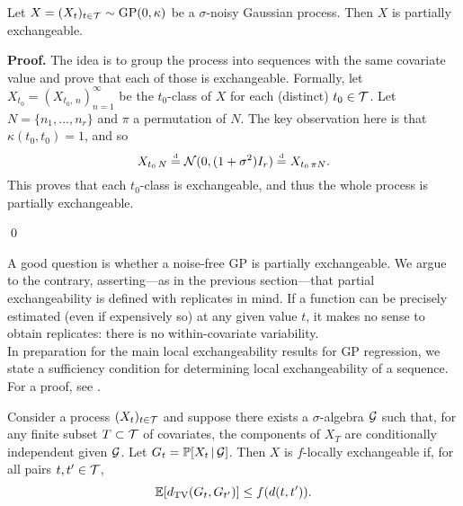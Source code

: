 \begin{proposition} \label{prop:GP_partial_exch}
	Let $X = (X_t)_{t \in \mathcal{T}} \sim \mathrm{GP} (0, \kappa)$ be a $\sigma$-noisy Gaussian process. Then $X$ is partially exchangeable.
\end{proposition}

\textbf{Proof. \hspace{0.05cm}} The idea is to group the process into sequences with the same covariate value and prove that each of those is exchangeable. Formally, let $X_{t_0} = (X_{t_0, \, n})_{n=1}^{\infty}$ be the $t_0$-class of $X$ for each (distinct) $t_0 \in \mathcal{T}$. Let $N = \{n_1, ..., n_r \}$ and $\pi$ a permutation of $N$. The key observation here is that $\kappa(t_0, t_0) = 1$, and so
\begin{equation} \label{eq:GP_partial_exchangeability}
	X_{t_0 \, N} \stackrel{\text{\rm\tiny d}}{=} \mathcal{N} (0, (1+\sigma^2) I_r) \stackrel{\text{\rm\tiny d}}{=} X_{t_0 \, \pi N}.
\end{equation}
This proves that each $t_0$-class is exchangeable, and thus the whole process is partially exchangeable.

\qed

\vskip 0.2cm

A good question is whether a noise-free GP is partially exchangeable. We argue to the contrary, asserting---as in the previous section---that partial exchangeability is defined with replicates in mind. If a function can be precisely estimated (even if expensively so) at any given value $t$, it makes no sense to obtain replicates: there is no within-covariate variability. 
\\




In preparation for the main local exchangeability results for GP regression, we state a sufficiency condition for determining local exchangeability of a sequence. For a proof, see \cite[][Proposition 3]{CampbellEtAl:2019:LocalExch}.

\begin{proposition} \label{prop:sufficient_local_exchangeability}
	Consider a process $(X_t)_{t \in \mathcal{T}}$ and suppose there exists a $\sigma$-algebra $\mathcal{G}$ such that, for any finite subset $T \subset \mathcal{T}$ of covariates, the components of $X_T$ are conditionally independent given $\mathcal{G}$. Let $G_t = \mathbb{P} [X_t \, | \, \mathcal{G} ]$. Then $X$ is $f$-locally exchangeable if, for all pairs $t, t' \in \mathcal{T}$,
	\begin{equation} \label{eq:sufficient_local_exchangeability}
		\mathbb{E}[d_{\mathrm{TV}} (G_t , G_{t'} ) ] \leq f(d(t, t')).
	\end{equation}
\end{proposition}

